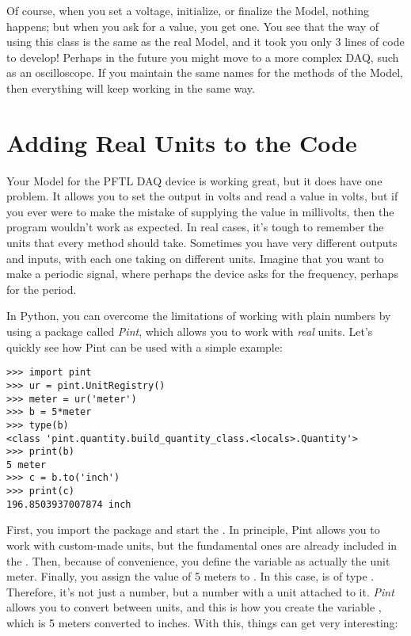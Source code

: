Of course, when you set a voltage, initialize, or finalize the Model, nothing happens; but when you ask for a value, you get one. You see that the way of using this class is the same as the real Model, and it took you only 3 lines of code to develop! Perhaps in the future you might move to a more complex DAQ, such as an oscilloscope. If you maintain the same names for the methods of the Model, then everything will keep working in the same way.


\section{Adding Real Units to the Code}\label{sec:pint}
Your Model for the {PFTL DAQ} device is working great, but it does have one problem. It allows you to set the output in volts and read a value in volts, but if you ever were to make the mistake of supplying the value in millivolts, then the program wouldn't work as expected. In real cases, it's tough to remember the units that every method should take. Sometimes you have very different outputs and inputs, with each one taking on different units. Imagine that you want to make a periodic signal, where perhaps the device asks for the frequency, perhaps for the period.

In Python, you can overcome the limitations of working with plain numbers by using a package called \emph{Pint}, which allows you to work with \emph{real} units. Let's quickly see how Pint can be used with a simple example:

\begin{verbatim}
>>> import pint
>>> ur = pint.UnitRegistry()
>>> meter = ur('meter')
>>> b = 5*meter
>>> type(b)
<class 'pint.quantity.build_quantity_class.<locals>.Quantity'>
>>> print(b)
5 meter
>>> c = b.to('inch')
>>> print(c)
196.8503937007874 inch
\end{verbatim}

First, you import the package and start the . In principle, Pint allows you to work with custom-made units, but the fundamental ones are already included in the . Then, because of convenience, you define the variable  as actually the unit meter. Finally, you assign the value of 5 meters to . In this case,  is of type . Therefore, it's not just a number, but a number with a unit attached to it. \emph{Pint} allows you to convert between units, and this is how you create the variable , which is 5 meters converted to inches. With this, things can get very interesting:

